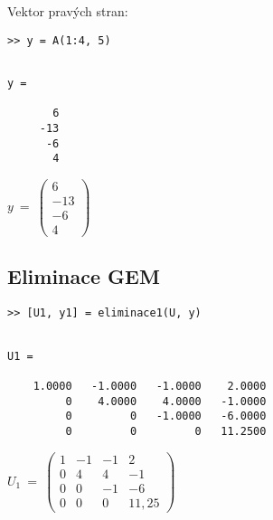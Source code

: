 \documentclass[a4paper,10pt]{article}
\begin{document}

\par Vektor pravých stran:

\begin{verbatim}
>> y = A(1:4, 5)
\end{verbatim}

\begin{minipage}[t]{.5\textwidth}
\begin{verbatim}

y =

       6
     -13
      -6
       4

\end{verbatim}
\end{minipage}%
\begin{minipage}[t]{.5\textwidth}

\bigskip
\bigskip

$
y~=~
\left( \begin{array}{r}
  6 \\
-13 \\
 -6 \\
  4 
\end{array} \right)
$

\vfill
\end{minipage}


\newpage
\subsection{Eliminace GEM}

\begin{verbatim}
>> [U1, y1] = eliminace1(U, y)
\end{verbatim}

\begin{minipage}[t]{.5\textwidth}
\begin{verbatim}

U1 =

    1.0000   -1.0000   -1.0000    2.0000
         0    4.0000    4.0000   -1.0000
         0         0   -1.0000   -6.0000
         0         0         0   11.2500

\end{verbatim}
\end{minipage}%
\begin{minipage}[t]{.5\textwidth}

\bigskip
\bigskip

$
U_1~=~
\left( \begin{array}{rrrr}
1 & -1 & -1 &  2 \\
0 &  4 &  4 & -1 \\
0 &  0 & -1 & -6 \\
0 &  0 &  0 & 11,25 
\end{array} \right)
$
\vfill
\end{minipage}
\end{document}
